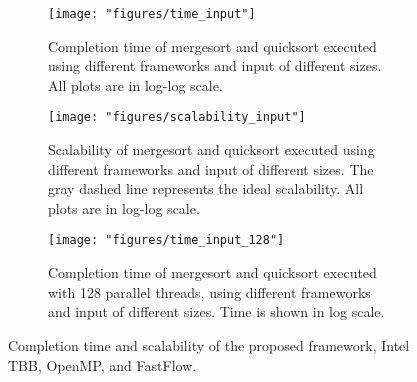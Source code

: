 \documentclass[11pt, a4paper]{article}
\begin{document}
\begin{figure}[t]
	\begin{subfigure}{\linewidth}
		\centering
		\texttt{[image: "figures/time\_input"]}
		\caption{Completion time of mergesort and quicksort executed using different frameworks and input of different sizes. All plots are in log-log scale.}
		\label{fig:framework-comparison-time}
	\end{subfigure}\vspace{2ex}
	\begin{subfigure}{\linewidth}
		\centering
		\texttt{[image: "figures/scalability\_input"]}
		\caption{Scalability of mergesort and quicksort executed using different frameworks and input of different sizes. The gray dashed line represents the ideal scalability. All plots are in log-log scale.}
		\label{fig:framework-comparison-scalability}
	\end{subfigure}\vspace{2ex}
	\begin{subfigure}{\linewidth}
		\centering
		\texttt{[image: "figures/time\_input\_128"]}
		\caption{Completion time of mergesort and quicksort executed with 128 parallel threads, using different frameworks and input of different sizes. Time is shown in log scale.}
		\label{fig:framework-comparison-128}
	\end{subfigure}
	\caption{Completion time and scalability of the proposed framework, Intel TBB, OpenMP, and FastFlow.}
	\label{fig:framework-comparison}
\end{figure}
\end{document}
